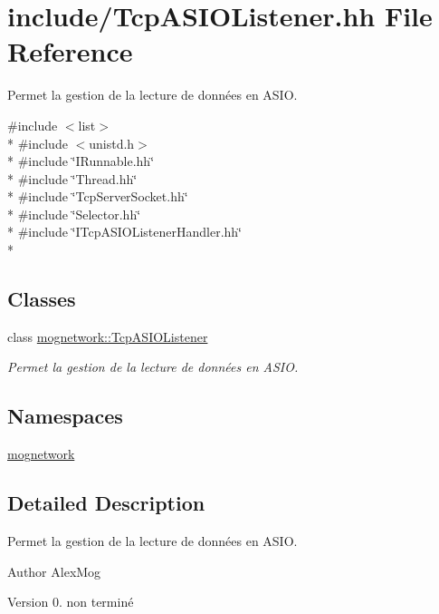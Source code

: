 \hypertarget{_tcp_a_s_i_o_listener_8hh}{\section{include/\-Tcp\-A\-S\-I\-O\-Listener.hh File Reference}
\label{_tcp_a_s_i_o_listener_8hh}
}


Permet la gestion de la lecture de données en A\-S\-I\-O.  


{\ttfamily \#include $<$list$>$}\\*
{\ttfamily \#include $<$unistd.\-h$>$}\\*
{\ttfamily \#include \char`\"{}I\-Runnable.\-hh\char`\"{}}\\*
{\ttfamily \#include \char`\"{}Thread.\-hh\char`\"{}}\\*
{\ttfamily \#include \char`\"{}Tcp\-Server\-Socket.\-hh\char`\"{}}\\*
{\ttfamily \#include \char`\"{}Selector.\-hh\char`\"{}}\\*
{\ttfamily \#include \char`\"{}I\-Tcp\-A\-S\-I\-O\-Listener\-Handler.\-hh\char`\"{}}\\*
\subsection*{Classes}
\begin{DoxyCompactItemize}
\item 
class \hyperlink{classmognetwork_1_1_tcp_a_s_i_o_listener}{mognetwork\-::\-Tcp\-A\-S\-I\-O\-Listener}
\begin{DoxyCompactList}\small\item\em Permet la gestion de la lecture de données en A\-S\-I\-O. \end{DoxyCompactList}\end{DoxyCompactItemize}
\subsection*{Namespaces}
\begin{DoxyCompactItemize}
\item 
\hyperlink{namespacemognetwork}{mognetwork}
\end{DoxyCompactItemize}


\subsection{Detailed Description}
Permet la gestion de la lecture de données en A\-S\-I\-O. \begin{DoxyAuthor}{Author}
Alex\-Mog 
\end{DoxyAuthor}
\begin{DoxyVersion}{Version}
0.  non terminé 
\end{DoxyVersion}
